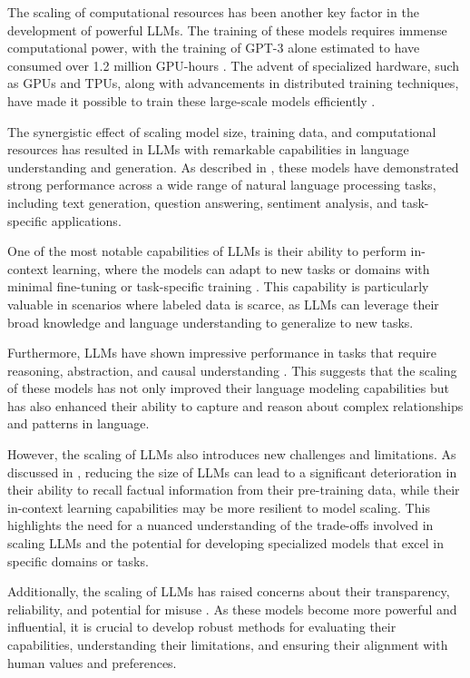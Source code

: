 \documentclass[11pt]{article}
\begin{document}
The scaling of computational resources has been another key factor in the development of powerful LLMs. The training of these models requires immense computational power, with the training of GPT-3 alone estimated to have consumed over 1.2 million GPU-hours \cite{ref21}. The advent of specialized hardware, such as GPUs and TPUs, along with advancements in distributed training techniques, have made it possible to train these large-scale models efficiently \cite{ref24}.

The synergistic effect of scaling model size, training data, and computational resources has resulted in LLMs with remarkable capabilities in language understanding and generation. As described in \cite{ref1}, these models have demonstrated strong performance across a wide range of natural language processing tasks, including text generation, question answering, sentiment analysis, and task-specific applications.

One of the most notable capabilities of LLMs is their ability to perform in-context learning, where the models can adapt to new tasks or domains with minimal fine-tuning or task-specific training \cite{ref21}. This capability is particularly valuable in scenarios where labeled data is scarce, as LLMs can leverage their broad knowledge and language understanding to generalize to new tasks.

Furthermore, LLMs have shown impressive performance in tasks that require reasoning, abstraction, and causal understanding \cite{ref25}. This suggests that the scaling of these models has not only improved their language modeling capabilities but has also enhanced their ability to capture and reason about complex relationships and patterns in language.

However, the scaling of LLMs also introduces new challenges and limitations. As discussed in \cite{ref26}, reducing the size of LLMs can lead to a significant deterioration in their ability to recall factual information from their pre-training data, while their in-context learning capabilities may be more resilient to model scaling. This highlights the need for a nuanced understanding of the trade-offs involved in scaling LLMs and the potential for developing specialized models that excel in specific domains or tasks.

Additionally, the scaling of LLMs has raised concerns about their transparency, reliability, and potential for misuse \cite{ref27}. As these models become more powerful and influential, it is crucial to develop robust methods for evaluating their capabilities, understanding their limitations, and ensuring their alignment with human values and preferences.
\end{document}
